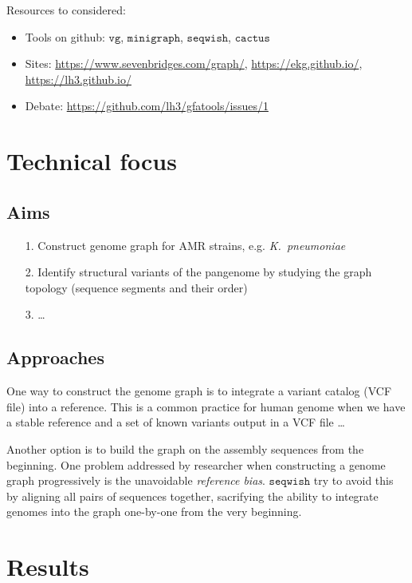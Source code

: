 \documentclass[10pt,twocolumn,twoside]{genpaper}
\newcommand{\vg}{$\mathtt{vg}$}
\newcommand{\mg}{$\mathtt{minigraph}$}
\newcommand{\sw}{$\mathtt{seqwish}$}
\newcommand{\kp}{\emph{K.~pneumoniae}}
\begin{document}
Resources to considered:
\begin{itemize}
\item Tools on github: \vg{}, \mg{}, \sw{}, $\mathtt{cactus}$
\item Sites: \url{https://www.sevenbridges.com/graph/}, \url{https://ekg.github.io/}, \url{https://lh3.github.io/}
\item Debate: \url{https://github.com/lh3/gfatools/issues/1}
\end{itemize}
\section*{Technical focus}
\subsection*{Aims}
\begin{itemize}
\item[1.] Construct genome graph for AMR strains, e.g. \kp{}
\item[2.] Identify structural variants of the pangenome by studying the graph topology (sequence segments and their order)  
\item[3.] \ldots
\end{itemize}
\subsection*{Approaches}
One way to construct the genome graph is to integrate a variant catalog (VCF file) into a reference. This is a common practice for human genome when we have a stable reference and a set of known variants output in a VCF file \ldots

Another option is to build the graph on the assembly sequences from the beginning.
One problem addressed by researcher when constructing a genome graph progressively is the unavoidable \emph{reference bias}.
\sw{} try to avoid this by aligning all pairs of sequences together, sacrifying the ability to integrate genomes into the graph one-by-one from the very beginning.

\section*{Results}


 
\end{document}
